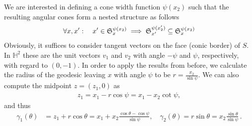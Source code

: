 \documentclass{article}
\begin{document}
We are interested in defining a cone width function $\psi(x_2)$ such that the resulting angular cones form a nested structure as follows
\begin{align}
\forall x,x': \quad x' \in \frak S^{\psi(x_2)}_x  \; \Longrightarrow \; \frak S^{\psi(x'_2)}_{x'} 
\subseteq \frak S^{\psi(x_2)}_x 
\end{align}
Obviously, it suffices to consider tangent vectors on the face (conic border) of $S$. In $\mathbb H^2$ these are the unit vectors $v_1$ and $v_2$ with angle $-\psi$ and $\psi$, respectively, with regard to $(0,-1)$. In order to apply the results from before, we calculate the radius of the geodesic leaving $x$ with angle $\psi$ to be $r = \tfrac{x_2}{\sin \psi}$. We can also compute the midpoint $z=(z_1,0)$ as
\begin{align}
z_1 = x_1 - r \cos \psi = x_1 - x_2 \cot \psi ,
\end{align}
and thus
\begin{align}
\gamma_1(\theta) & = z_1 + r \cos \theta = x_1 + x_2  \tfrac{\cos\theta - \cos\psi}{\sin \psi}, \quad 
\gamma_2(\theta) = r \sin \theta = x_2 \tfrac{\sin\theta}{\sin \psi}  \,.
\end{align}



\end{document}
